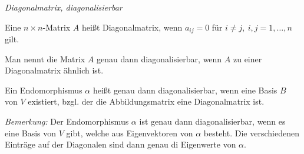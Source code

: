 \begin{mydef} \textit{Diagonalmatrix, diagonalisierbar} \par
    Eine $n\times n$-Matrix $A$ heißt Diagonalmatrix, wenn $a_{ij}=0$ für $i\neq j, \ i,j=1,\ldots,n$ gilt. \par \medskip
    Man nennt die Matrix $A$ genau dann diagonalisierbar, wenn $A$ zu einer Diagonalmatrix ähnlich ist. \par \medskip
    Ein Endomorphismus $\alpha$ heißt genau dann diagonalisierbar, wenn eine Basis $B$ von $V$ existiert, bzgl. der die Abbildungsmatrix eine 
    Diagonalmatrix ist.
\end{mydef}


\textit{Bemerkung:}
    Der Endomorphismus $\alpha$ ist genau dann diagonalisierbar, wenn es eine Basis von $V$ gibt, welche aus Eigenvektoren von $\alpha$ besteht. Die 
    verschiedenen Einträge auf der Diagonalen sind dann genau di Eigenwerte von $\alpha$.

